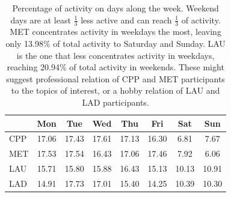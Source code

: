 \documentclass[%
 aip,
 jmp,%
 amsmath,amssymb,
 reprint,%
]{revtex4-1}
\begin{document}
\begin{table}[h]
    \caption{Percentage of activity on days along the week. Weekend days are at least $\frac{1}{3}$ less active and can reach $\frac{1}{3}$ of activity. MET concentrates activity in weekdays the most, leaving only 13.98\% of total activity to Saturday and Sunday. LAU is the one that less concentrates activity in weekdays, reaching 20.94\% of total activity in weekends. These might suggest professional relation of CPP and MET participants to the topics of interest, or a hobby relation of LAU and LAD participants.}
\begin{center}
    \begin{tabular}{ | l |  c | c | c | c | c |   c | c |}
        \hline
        & Mon & Tue & Wed & Thu & Fri & Sat & Sun  \\ \hline
        CPP & 17.06 & 17.43 & 17.61 & 17.13 & 16.30 & 6.81 & 7.67 \\ \hline
        MET & 17.53 & 17.54 & 16.43 & 17.06 & 17.46 & 7.92 & 6.06 \\ \hline
        LAU & 15.71 & 15.80 & 15.88 & 16.43 & 15.13 & 10.13 & 10.91 \\ \hline
        LAD & 14.91 & 17.73 & 17.01 & 15.40 & 14.25 & 10.39 & 10.30 \\\hline
    \end{tabular}
\end{center}
\label{semana}
\end{table}
\end{document}
